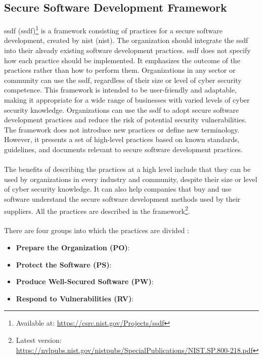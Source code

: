 \subsection{Secure Software Development Framework}
\label{ssdf}
\acrlong{ssdf} (\acrshort{ssdf})\footnote{Available at: \url{https://csrc.nist.gov/Projects/ssdf}} is a framework consisting of practices for a secure software development, created by \acrlong{nist} (\acrshort{nist}). The organization should integrate the \acrshort{ssdf} into their already existing software development practices. \acrshort{ssdf} does not specify how each practice should be implemented. It emphasizes the outcome of the practices rather than how to perform them. Organizations in any sector or community can use the \acrshort{ssdf}, regardless of their size or level of cyber security competence. This framework is intended to be user-friendly and adaptable, making it appropriate for a wide range of businesses with varied levels of cyber security knowledge. Organizations can use the \acrshort{ssdf} to adopt secure software development practices and reduce the risk of potential security vulnerabilities. The framework does not introduce new practices or define new terminology. However, it presents a set of high-level practices based on known standards, guidelines, and documents relevant to secure software development practices. 
\\~\\
The benefits of describing the practices at a high level include that they can be used by organizations in every industry and community, despite their size or level of cyber security knowledge. It can also help companies that buy and use software understand the secure software development methods used by their suppliers. All the practices are described in the framework\footnote{Latest version: \url{https://nvlpubs.nist.gov/nistpubs/SpecialPublications/NIST.SP.800-218.pdf}}.
\\~\\
There are four groups into which the practices are divided \cite{ssdf}:
\begin{itemize}
  \item \textbf{Prepare the Organization (PO)}: \textit{}
  \item \textbf{Protect the Software (PS)}: \textit{}
  \item \textbf{Produce Well-Secured Software (PW)}: \textit{}
  \item \textbf{Respond to Vulnerabilities (RV)}: \textit{}
\end{itemize}

